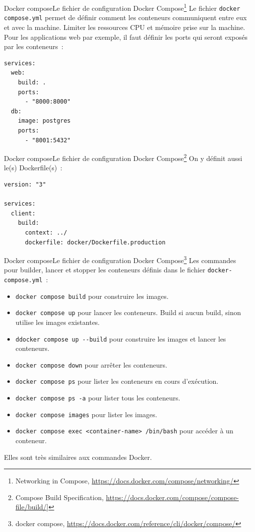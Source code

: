 \documentclass{beamer}
\begin{document}
    \begin{frame}[fragile]{Docker compose}{Le fichier de configuration Docker Compose\footnote{Networking in Compose, \url{https://docs.docker.com/compose/networking/}}}
        Le fichier \lstinline{docker compose.yml} permet de définir comment les conteneurs communiquent entre eux et avec la machine.
        Limiter les ressources CPU et mémoire prise sur la machine.
        \bigbreak
        Pour les applications web par exemple, il faut définir les ports qui seront exposés par les conteneurs~:
        \begin{lstlisting}
services:
  web:
    build: .
    ports:
      - "8000:8000"
  db:
    image: postgres
    ports:
      - "8001:5432"
        \end{lstlisting}
    \end{frame}

    \begin{frame}[fragile]{Docker compose}{Le fichier de configuration Docker Compose\footnote{Compose Build Specification, \url{https://docs.docker.com/compose/compose-file/build/}]}}
        On y définit aussi le(s) Dockerfile(s)~:
        \begin{lstlisting}
version: "3"

services:
  client:
    build:
      context: ../
      dockerfile: docker/Dockerfile.production
        \end{lstlisting}
    \end{frame}

    \begin{frame}[fragile]{Docker compose}{Le fichier de configuration Docker Compose\footnote{docker compose, \url{https://docs.docker.com/reference/cli/docker/compose/}}}
        \small
        Les commandes pour builder, lancer et stopper les conteneurs définis dans le fichier \lstinline{docker-compose.yml}~:
        \begin{itemize}
            \item \lstinline{docker compose build} pour construire les images.
            \item \lstinline{docker compose up} pour lancer les conteneurs.
            Build si aucun build, sinon utilise les images existantes.
            \item \lstinline{ddocker compose up --build} pour construire les images et lancer les conteneurs.
            \item \lstinline{docker compose down} pour arrêter les conteneurs.
            \item \lstinline{docker compose ps} pour lister les conteneurs en cours d'exécution.
            \item \lstinline{docker compose ps -a} pour lister tous les conteneurs.
            \item \lstinline{docker compose images} pour lister les images.
            \item \lstinline{docker compose exec <container-name> /bin/bash} pour accéder à un conteneur.
        \end{itemize}
        Elles sont très similaires aux commandes Docker.
    \end{frame}
\end{document}
